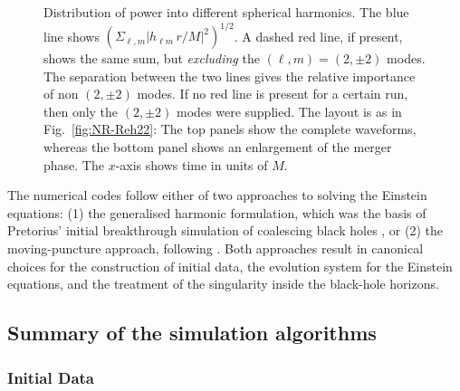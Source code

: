 \begin{figure}
\caption[Distribution of power into different spherical harmonics]{
\label{fig:NR-SumAllModes}
Distribution of power into different spherical harmonics.  The blue line shows
  $\left(\Sigma_{\ell,m}|h_{\ell m}\,r/M|^2\right)^{1/2}$.  A dashed red line, if
  present, shows the same sum, but {\em excluding} the $(\ell,m)=(2,\pm
  2)$ modes. 
  The separation between the two lines gives the relative importance
  of non $(2,\pm 2)$ modes.  If no red line is present for a certain
  run, then only the $(2,\pm 2)$ modes were supplied.  The layout is
  as in Fig.~\ref{fig:NR-Reh22}: The top panels show the complete
  waveforms, whereas the bottom panel shows an enlargement of the
  merger phase. The $x$-axis shows time in units of $M$.
}
\end{figure}

\iffalse
The numerical codes follow either of two approaches to solving the
Einstein equations: (1) the generalised harmonic formulation, which
was the basis of Pretorius' initial breakthrough simulation of
coalescing black holes \cite{Pretorius:2005gq}, or (2) the
moving-puncture approach, following
\cite{Campanelli:2005dd,Baker:2005vv}.  Both approaches result in
canonical choices for the construction of initial data, the evolution
system for the Einstein equations, and the treatment of the
singularity inside the black-hole horizons.


\subsection{Summary of the simulation algorithms}
\label{ssec:sumalg}

\subsubsection{Initial Data}
\label{ssec:id}

